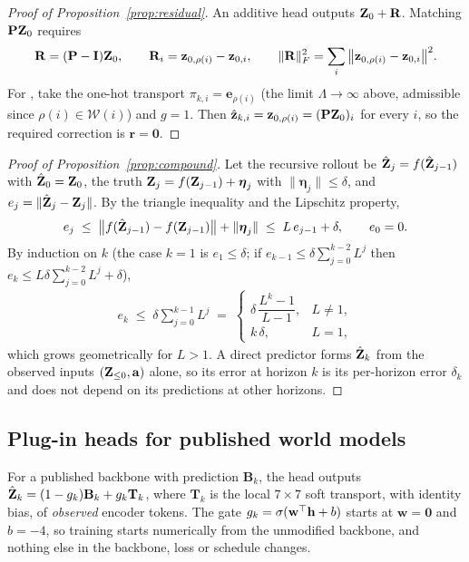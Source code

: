 \begin{proof}[Proof of Proposition~\ref{prop:residual}]
An additive head outputs $\mathbf{Z}_0+\mathbf{R}$. Matching $\mathbf{P}\mathbf{Z}_0$ requires
\begin{align}
\mathbf{R}=(\mathbf{P}-\mathbf{I})\mathbf{Z}_0,\qquad
\mathbf{R}_{i}=\mathbf{z}_{0,\rho(i)}-\mathbf{z}_{0,i},\qquad
\|\mathbf{R}\|_F^2=\sum_i\big\|\mathbf{z}_{0,\rho(i)}-\mathbf{z}_{0,i}\big\|^2 .
\end{align}
For \ours{}, take the one-hot transport $\pi_{k,i}=\mathbf{e}_{\rho(i)}$ (the limit $\Lambda\to\infty$ above, admissible since
$\rho(i)\in\mathcal{W}(i)$) and $g=1$. Then $\hat{\mathbf{z}}_{k,i}=\mathbf{z}_{0,\rho(i)}=(\mathbf{P}\mathbf{Z}_0)_i$ for every $i$,
so the required correction is $\mathbf{r}=\mathbf{0}$.
\end{proof}

\begin{proof}[Proof of Proposition~\ref{prop:compound}]
Let the recursive rollout be $\hat{\mathbf{Z}}_j=f(\hat{\mathbf{Z}}_{j-1})$ with $\hat{\mathbf{Z}}_0=\mathbf{Z}_0$, the truth
$\mathbf{Z}_j=f(\mathbf{Z}_{j-1})+\boldsymbol{\eta}_j$ with $\|\bm{\eta}_j\|\le\delta$, and $e_j=\|\hat{\mathbf{Z}}_j-\mathbf{Z}_j\|$. By the triangle inequality
and the Lipschitz property,
\begin{align}
e_j\;\le\;\big\|f(\hat{\mathbf{Z}}_{j-1})-f(\mathbf{Z}_{j-1})\big\|+\|\boldsymbol{\eta}_j\|\;\le\;L\,e_{j-1}+\delta,\qquad e_0=0 .
\end{align}
By induction on $k$ (the case $k=1$ is $e_1\le\delta$; if $e_{k-1}\le\delta\sum_{j=0}^{k-2}L^j$ then
$e_k\le L\delta\sum_{j=0}^{k-2}L^j+\delta$),
\begin{align}
e_k\;\le\;\delta\sum_{j=0}^{k-1}L^j\;=\;
\begin{cases}\delta\,\dfrac{L^k-1}{L-1}, & L\neq 1,\\[4pt] k\,\delta, & L=1,\end{cases}
\end{align}
which grows geometrically for $L>1$. A direct predictor forms $\hat{\mathbf{Z}}_k$ from the observed inputs
$(\mathbf{Z}_{\le 0},\mathbf{a})$ alone, so its error at horizon $k$ is its per-horizon error $\delta_k$ and does not depend on
its predictions at other horizons.
\end{proof}

\subsection{Plug-in heads for published world models}\label{app:plugin}
For a published backbone with prediction $\mathbf{B}_k$, the head outputs $\hat{\mathbf{Z}}_k=(1-g_k)\mathbf{B}_k+g_k\mathbf{T}_k$,
where $\mathbf{T}_k$ is the local $7{\times}7$ soft transport, with identity bias, of \emph{observed} encoder tokens.
%
The gate $g_k=\sigma(\mathbf{w}^\top\mathbf{h}+b)$ starts at $\mathbf{w}=\mathbf{0}$ and $b=-4$, so training starts numerically
from the unmodified backbone, and nothing else in the backbone, loss or schedule changes.

